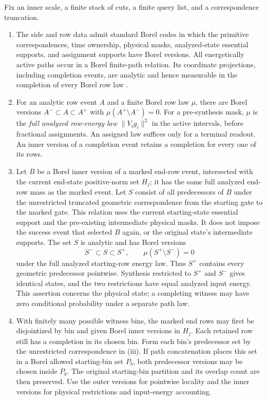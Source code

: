 \begin{lemma}
\label{cyl:borel-paths}
Fix an inner scale, a finite stack of cuts, a finite query list, and a
correspondence truncation.
\begin{enumerate}[label=\textup{(\roman*)}]
\item The side and row data admit standard Borel codes in which the
primitive correspondences, time ownership, physical masks, analyzed-state
essential supports, and assignment supports have Borel versions. All
energetically active paths occur in a Borel finite-path relation. Its coordinate
projections, including completion events, are analytic and hence
measurable in the completion of every Borel row law
\cite[Section~3, Theorem~2]{BertsekasShreveBorel}.

\item For an analytic row event $A$ and a finite Borel row law $\mu$,
there are Borel versions $A^-\subset A\subset A^+$ with
$\mu(A^+\setminus A^-)=0$. For a pre-synthesis mask, $\mu$ is the
\emph{full analyzed row-energy law} $\|V_i g_i\|^2$ in the active
intervals, before fractional assignments. An assigned law suffices only
for a terminal readout. An inner version of a completion event retains
a completion for every one of its rows.

\item Let $B$ be a Borel inner version of a marked end-row event,
intersected with the current end-state positive-norm set $H_j$; it has
the same full analyzed end-row mass as the marked event. Let $S$ consist of all predecessors
of $B$ under the unrestricted truncated geometric correspondence from
the starting gate to the marked gate. This relation uses the current
starting-state essential support and the pre-existing intermediate
physical masks. It does not impose the success event that selected $B$
again, or the original state's intermediate supports. The set $S$ is
analytic and has Borel versions
\[
 S^-\subset S\subset S^+,
 \qquad \mu(S^+\setminus S^-)=0
\]
under the full analyzed starting-row energy law. Thus $S^+$ contains
every geometric predecessor pointwise. Synthesis restricted to $S^+$ and
$S^-$ gives identical states, and the two restrictions have equal
analyzed input energy.
This assertion concerns the physical state; a completing witness may
have zero conditional probability under a separate path law.

\item With finitely many possible witness bins, the marked end rows
may first be disjointized by bin and given Borel inner versions in
$H_j$. Each retained row still has a completion in its chosen bin.
Form each bin's predecessor set by the unrestricted correspondence in
\textup{(iii)}. If path concatenation places this set in a Borel allowed
starting-bin set $P_b$, both predecessor versions may be chosen inside
$P_b$. The original starting-bin partition and its overlap count are
then preserved. Use the outer versions for pointwise locality and the
inner versions for physical restrictions and input-energy accounting.


\end{enumerate}
\end{lemma}
